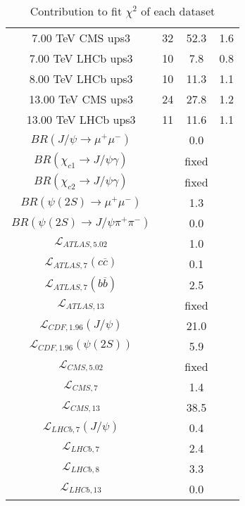 \begin{table}[h!]
\begin{tabular}{c|c|c|c}
7.00 TeV CMS ups3 & 32 & 52.3 & 1.6 \\
7.00 TeV LHCb ups3 & 10 & 7.8 & 0.8 \\
8.00 TeV LHCb ups3 & 10 & 11.3 & 1.1 \\
13.00 TeV CMS ups3 & 24 & 27.8 & 1.2 \\
13.00 TeV LHCb ups3 & 11 & 11.6 & 1.1 \\
\hline
$BR(J/\psi\rightarrow\mu^+\mu^-)$ &  & 0.0 &  \\
$BR(\chi_{c1}\rightarrow J/\psi\gamma)$ &  & fixed & \\
$BR(\chi_{c2}\rightarrow J/\psi\gamma)$ &  & fixed & \\
$BR(\psi(2S)\rightarrow\mu^+\mu^-)$ &  & 1.3 &  \\
$BR(\psi(2S)\rightarrow J/\psi\pi^+\pi^-)$ &  & 0.0 &  \\
$\mathcal L_{ATLAS,5.02}$ &  & 1.0 &  \\
$\mathcal L_{ATLAS,7}(c\overline c)$ &  & 0.1 &  \\
$\mathcal L_{ATLAS,7}(b\overline b)$ &  & 2.5 &  \\
$\mathcal L_{ATLAS,13}$ &  & fixed & \\
$\mathcal L_{CDF,1.96}(J/\psi)$ &  & 21.0 &  \\
$\mathcal L_{CDF,1.96}(\psi(2S))$ &  & 5.9 &  \\
$\mathcal L_{CMS,5.02}$ &  & fixed & \\
$\mathcal L_{CMS,7}$ &  & 1.4 &  \\
$\mathcal L_{CMS,13}$ &  & 38.5 &  \\
$\mathcal L_{LHCb,7}(J/\psi)$ &  & 0.4 &  \\
$\mathcal L_{LHCb,7}$ &  & 2.4 &  \\
$\mathcal L_{LHCb,8}$ &  & 3.3 &  \\
$\mathcal L_{LHCb,13}$ &  & 0.0 &  \\
\end{tabular}
\caption{Contribution to fit $\chi^2$ of each dataset}
\end{table}
